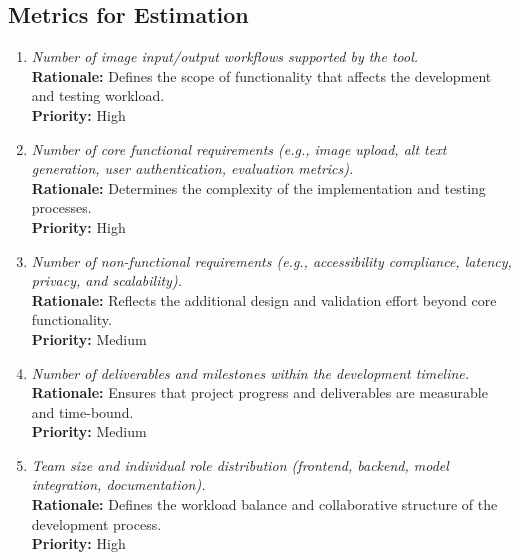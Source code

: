 \documentclass[12pt]{article}
\begin{document}
\subsection{Metrics for Estimation}
\begin{enumerate}[label=C-ME \arabic*., wide=0pt, leftmargin=*]
\item \emph{Number of image input/output workflows supported by the tool.}\\[2mm] 
    {\bf Rationale:} Defines the scope of functionality that affects the development and testing workload.\\
    {\bf Priority:} High

\item \emph{Number of core functional requirements (e.g., image upload, alt text generation, user authentication, evaluation metrics).}\\[2mm] 
    {\bf Rationale:} Determines the complexity of the implementation and testing processes.\\
    {\bf Priority:} High

\item \emph{Number of non-functional requirements (e.g., accessibility compliance, latency, privacy, and scalability).}\\[2mm] 
    {\bf Rationale:} Reflects the additional design and validation effort beyond core functionality.\\
    {\bf Priority:} Medium

\item \emph{Number of deliverables and milestones within the development timeline.}\\[2mm] 
    {\bf Rationale:} Ensures that project progress and deliverables are measurable and time-bound.\\
    {\bf Priority:} Medium

\item \emph{Team size and individual role distribution (frontend, backend, model integration, documentation).}\\[2mm] 
    {\bf Rationale:} Defines the workload balance and collaborative structure of the development process.\\
    {\bf Priority:} High
\end{enumerate}
\end{document}
